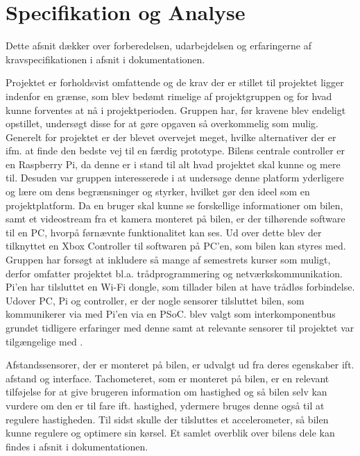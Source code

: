\section{Specifikation og Analyse}\label{ch:Specifikation_og_Analyse}

Dette afsnit dækker over forberedelsen, udarbejdelsen og erfaringerne af kravspecifikationen i afsnit  i dokumentationen.

Projektet er forholdsvist omfattende og de krav der er stillet til projektet ligger indenfor en grænse, som blev bedømt rimelige af projektgruppen og for hvad kunne forventes at nå i projektperioden. 
Gruppen har, før kravene blev endeligt opstillet, undersøgt disse for at gøre opgaven så  overkommelig som mulig.
Generelt for projektet er der blevet overvejet meget, hvilke alternativer der er ifm. at finde den bedste vej til en færdig prototype.
Bilens centrale controller er en Raspberry Pi, da denne er i stand til alt hvad projektet skal kunne og mere til. 
Desuden var gruppen interesserede i at undersøge denne platform yderligere og lære om dens begrænsninger og styrker, hvilket gør den ideel som en projektplatform.
Da en bruger skal kunne se forskellige informationer om bilen, samt et videostream fra et kamera monteret på bilen, er der tilhørende software til en PC, hvorpå førnævnte funktionalitet kan ses.
Ud over dette blev der tilknyttet en Xbox Controller til softwaren på PC'en, som bilen kan styres med.
Gruppen har forsøgt at inkludere så mange af semestrets kurser som muligt, derfor omfatter projektet bl.a. trådprogrammering og netværkskommunikation. 
Pi'en har tilsluttet en Wi-Fi dongle, som tillader bilen at have trådløs forbindelse. Udover PC, Pi og controller, er der nogle sensorer tilsluttet bilen, som kommunikerer via \IIC med Pi'en via en PSoC. 
\IIC blev valgt som interkomponentbus grundet tidligere erfaringer med denne samt at relevante sensorer til projektet var tilgængelige med \IIC. 

Afstandssensorer, der er monteret på bilen, er udvalgt ud fra deres egenskaber ift. afstand og interface. Tachometeret, som er monteret på bilen, er en relevant tilføjelse for at give brugeren information om hastighed og så bilen selv kan vurdere om den er til fare ift. hastighed, ydermere bruges denne også til at regulere hastigheden. Til sidst skulle der tilsluttes et accelerometer, så bilen kunne regulere og optimere sin kørsel. 
Et samlet overblik over bilens dele kan findes i afsnit  i dokumentationen.


